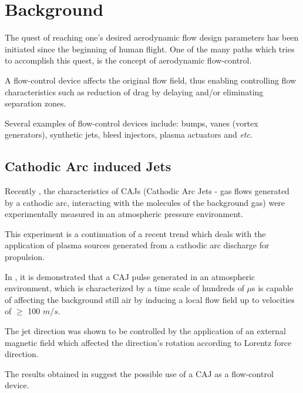 \documentclass[10pt,a4paper]{article}
\begin{document}


\section{Background}
The quest of reaching one's desired aerodynamic flow design parameters has been initiated since the beginning of human flight. One of the many paths which tries to accomplish this quest, is the concept of aerodynamic flow-control.
\par A flow-control device affects the original flow field, thus enabling controlling flow characteristics such as reduction of drag by delaying and/or eliminating separation zones. \par Several examples of flow-control devices include: bumps, vanes (vortex generators), synthetic jets, bleed injectors, plasma actuators and \textit{etc}.
\subsection*{Cathodic Arc induced Jets}
Recently \cite{1}, the characteristics of CAJs (Cathodic Arc Jets - gas flows generated by a cathodic arc, interacting with the molecules of the background gas) were experimentally measured in an atmospheric pressure environment.
\par This experiment is a continuation of a recent trend which deals with the application of plasma sources generated from a cathodic arc discharge for propulsion.
\par In \cite{1}, it is demonstrated that a CAJ pulse generated in an atmospheric environment, which is characterized by a time scale of hundreds of $\mu$s is capable of affecting the background still air by inducing a local flow field up to velocities of $\ge$ 100 $m/s$. 
\par The jet direction was shown to be controlled by the application of an external magnetic field which affected the direction's rotation according to Lorentz force direction. 
\par The results obtained in \cite{1} suggest the possible use of a CAJ as a flow-control device. 
\end{document}
